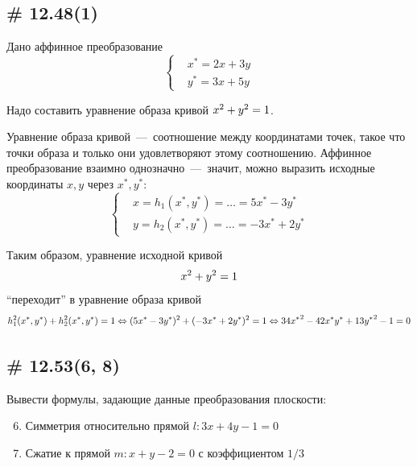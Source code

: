 \documentclass[a4paper,12pt]{article}
\begin{document}
  
  \subsection{\# 12.48(1)}
  
  Дано аффинное преобразование
  \[
    \left\{
      \begin{aligned}
        &x^* = 2x + 3y\\
        &y^* = 3x + 5y
      \end{aligned}
    \right.
  \]
  
  Надо составить уравнение образа кривой $x^2 \hm+ y^2 \hm= 1$.
  
  \begin{solution}
    Уравнение образа кривой~---~соотношение между координатами точек, такое что точки образа и только они удовлетворяют этому соотношению.
    Аффинное преобразование взаимно однозначно~---~значит, можно выразить исходные координаты $x, y$ через $x^*, y^*$:
    \[
      \left\{
        \begin{aligned}
          &x = h_1(x^*, y^*) = \ldots = 5x^* - 3y^*\\
          &y = h_2(x^*, y^*) = \ldots = -3x^* + 2y^*
        \end{aligned}
      \right.
    \]
    
    Таким образом, уравнение исходной кривой
    \[
      x^2 + y^2 \hm= 1
    \]
    ``переходит'' в уравнение образа кривой
    \[
      h_1^2(x^*, y^*) + h_2^2(x^*, y^*) \hm= 1
        \Leftrightarrow (5x^* - 3y^*)^2 + (-3x^* + 2y^*)^2 = 1
        \Leftrightarrow {34x^*}^2 - 42x^*y^* + {13y^*}^2 - 1 = 0
    \]
  \end{solution}
  
  
  \subsection{\# 12.53(6, 8)}
  
  Вывести формулы, задающие данные преобразования плоскости:
  \begin{enumerate}
    \setcounter{enumi}{5}
    
    \item Симметрия относительно прямой $l\colon 3x + 4y - 1 = 0$
    
    \setcounter{enumi}{7}
    
    \item Сжатие к прямой $m\colon x + y - 2 = 0$ с коэффициентом $1/3$
  \end{enumerate}
  
\end{document}
